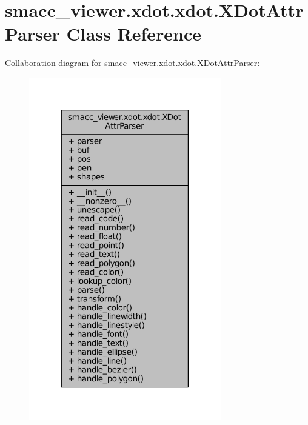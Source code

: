 \hypertarget{classsmacc__viewer_1_1xdot_1_1xdot_1_1XDotAttrParser}{}\section{smacc\+\_\+viewer.\+xdot.\+xdot.\+X\+Dot\+Attr\+Parser Class Reference}
\label{classsmacc__viewer_1_1xdot_1_1xdot_1_1XDotAttrParser}


Collaboration diagram for smacc\+\_\+viewer.\+xdot.\+xdot.\+X\+Dot\+Attr\+Parser\+:
\nopagebreak
\begin{figure}[H]
\begin{center}
\leavevmode
\includegraphics[width=237pt]{classsmacc__viewer_1_1xdot_1_1xdot_1_1XDotAttrParser__coll__graph}
\end{center}
\end{figure}

